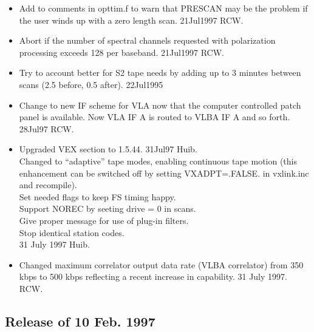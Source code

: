 \documentclass{report}
\begin{document}
\begin{itemize}
\item Add to comments in opttim.f to warn that PRESCAN may be the
      problem if the user winds up with a zero length scan.
      21Jul1997 RCW.

\item Abort if the number of spectral channels requested with
      polarization processing exceeds 128 per baseband.
      21Jul1997 RCW.

\item Try to account better for S2 tape needs by adding up to
      3 minutes between scans (2.5 before, 0.5 after).
      22Jul1995

\item Change to new IF scheme for VLA now that the computer controlled
      patch panel is available.  Now VLA IF A is routed to VLBA
      IF A and so forth.  28Jul97  RCW.

\item Upgraded VEX section to 1.5.44. 31Jul97 Huib.\\
      Changed to ``adaptive'' tape modes, enabling continuous tape
      motion (this enhancement can be switched off by setting
      VXADPT=.FALSE. in vxlink.inc and recompile). \\
      Set needed flags to keep FS timing happy. \\
      Support NOREC by seeting drive = 0 in scans. \\
      Give proper message for use of plug-in filters. \\
      Stop identical station codes. \\
      31 July 1997   Huib.

\item Changed maximum correlator output data rate (VLBA correlator) from
      350 kbps to 500 kbps reflecting a recent increase in capability.
      31 July 1997.  RCW.

\end{itemize}

\subsection{\label{SSSEC:FEB97}Release of 10 Feb. 1997}
\end{document}
